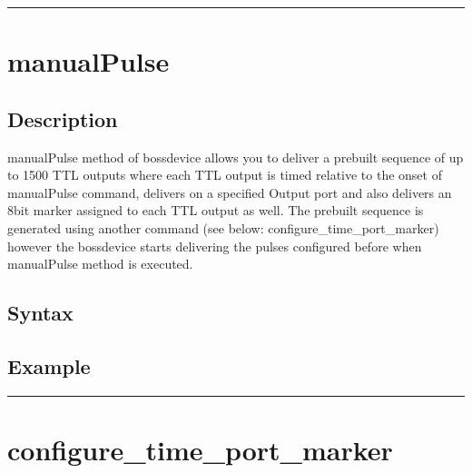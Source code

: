\documentclass[letterpaper,10pt,english]{sphinxmanual}
\begin{document}
\bigskip\hrule\bigskip



\section{manualPulse}
\label{\detokenize{4_api_documentation:manualpulse}}

\subsection{Description}
\label{\detokenize{4_api_documentation:id4}}
\sphinxAtStartPar
manualPulse method of bossdevice allows you to deliver a pre\sphinxhyphen{}built sequence of up to 1500 TTL outputs where each TTL output is timed relative to the onset of manualPulse command, delivers on a specified Output port and also delivers an 8\sphinxhyphen{}bit marker assigned to each TTL output as well.
The pre\sphinxhyphen{}built sequence is generated using another command (see below: configure\_time\_port\_marker) however the bossdevice starts delivering the pulses configured before when manualPulse method is executed.


\subsection{Syntax}
\label{\detokenize{4_api_documentation:id5}}
\begin{sphinxVerbatim}[commandchars=\\\{\}]
\end{sphinxVerbatim}


\subsection{Example}
\label{\detokenize{4_api_documentation:id6}}
\begin{sphinxVerbatim}[commandchars=\\\{\}]
\end{sphinxVerbatim}


\bigskip\hrule\bigskip



\section{configure\_time\_port\_marker}
\label{\detokenize{4_api_documentation:configure-time-port-marker}}
\end{document}
